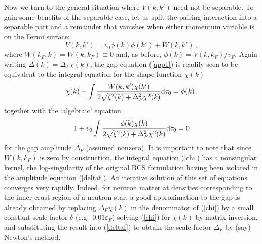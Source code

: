 Now we turn to the general situation  where $V(k,k')$ need not
be separable.  To gain some benefits of the separable case,
let us split the pairing interaction into a separable part and
a remainder that vanishes when either momentum variable is on
the Fermi surface:
\begin{equation}
V(k,k') = v_0\phi(k)\phi(k') + W(k,k') \, ,
\end{equation}
where
 $W(k_F,k)=W(k,k_F)\equiv 0$
and, as before, $\phi(k)=V(k,k_F)/v_F$.  Again writing
$\Delta(k) = \Delta_F \chi(k)$, the gap equation (\ref{app1})
is readily seen to be equivalent to the integral equation for
the shape function $\chi(k)$
\begin{equation}
\chi(k) + \int \frac{W(k,k')\chi(k')}
	{2\sqrt{\xi^2(k) + \Delta_F^2 \chi^2(k)}}{\rm d}\tau_0 = \phi(k)
	\, , \label{chi}
\end{equation}
together with the `algebraic' equation
\begin{equation}
1 + v_0\int \frac{\phi(k)\chi(k)}
{2\sqrt{\xi^2(k) + \Delta_F^2 \chi^2(k)}}{\rm d}\tau_0  = 0
	 \label{deltaf}
\end{equation}
for the gap amplitude $\Delta_F$ (assumed nonzero).  It is important
to note that since $W(k,k_F)$ is zero by construction, the integral
equation (\ref{chi}) has a nonsingular kernel, the log-singularity
of the original BCS formulation having been isolated in the amplitude 
equation (\ref{deltaf}).  An iterative solution of this set of equations 
converges very rapidly.  Indeed, for neutron matter at densities
corresponding to the inner-crust region of a neutron star,
a good approximation to the gap is already obtained by replacing
$\Delta_F \chi(k)$ in the denominator of (\ref{chi}) by
a small constant scale factor $\delta$ (e.g.\ $0.01 \varepsilon_F$)
solving (\ref{chi}) for $\chi(k)$ by matrix inversion, and
substituting the result into (\ref{deltaf}) to obtain the scale
factor $\Delta_F$ by (say) Newton's method.

